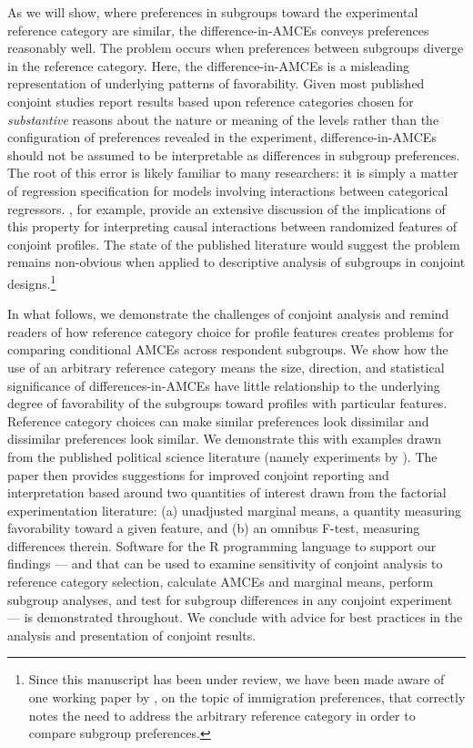 \documentclass[a4paper,12pt]{article}\usepackage[]{graphicx}\usepackage[]{color}
\begin{document}
As we will show, where preferences in subgroups toward the experimental reference category are similar, the difference-in-AMCEs conveys preferences reasonably well. The problem occurs when preferences between subgroups diverge in the reference category. Here, the difference-in-AMCEs is a misleading representation of underlying patterns of favorability. Given most published conjoint studies report results based upon reference categories chosen for \textit{substantive} reasons about the nature or meaning of the levels rather than the configuration of preferences revealed in the experiment, difference-in-AMCEs should not be assumed to be interpretable as differences in subgroup preferences. The root of this error is likely familiar to many researchers: it is simply a matter of regression specification for models involving interactions between categorical regressors. \citet{EgamiImai2018}, for example, provide an extensive discussion of the implications of this property for interpreting causal interactions between randomized features of conjoint profiles. The state of the published literature would suggest the problem remains non-obvious when applied to descriptive analysis of subgroups in conjoint designs.\footnote{Since this manuscript has been under review, we have been made aware of one working paper by \citet{ClaytonFerwerdaHoriuchi2018}, on the topic of immigration preferences, that correctly notes the need to address the arbitrary reference category in order to compare subgroup preferences.}

In what follows, we demonstrate the challenges of conjoint analysis and remind readers of how reference category choice for profile features creates problems for comparing conditional AMCEs across respondent subgroups. We show how the use of an arbitrary reference category means the size, direction, and statistical significance of differences-in-AMCEs have little relationship to the underlying degree of favorability of the subgroups toward profiles with particular features. Reference category choices can make similar preferences look dissimilar and dissimilar preferences look similar. We demonstrate this with examples drawn from the published political science literature (namely experiments by \citealt{HainmuellerHopkinsYamamoto2014, BechtelScheve2013, TeeleKallaRosenbluth2018}). The paper then provides suggestions for improved conjoint reporting and interpretation based around two quantities of interest drawn from the factorial experimentation literature: (a) unadjusted marginal means, a quantity measuring favorability toward a given feature, and (b) an omnibus F-test, measuring differences therein. Software for the R programming language to support our findings --- and that can be used to examine sensitivity of conjoint analysis to reference category selection, calculate AMCEs and marginal means, perform subgroup analyses, and test for subgroup differences in any conjoint experiment --- is demonstrated throughout. We conclude with advice for best practices in the analysis and presentation of conjoint results.
\end{document}
